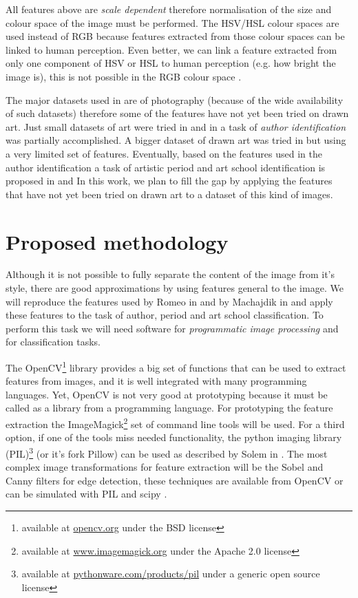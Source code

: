\documentclass[a4paper]{article}
\begin{document}
All features above are \emph{scale dependent} \cite{rmc12ajs,mach10clas}
therefore normalisation of the size and colour space of the image must be
performed.  The HSV/HSL colour spaces are used instead of RGB because features
extracted from those colour spaces can be linked to human perception.  Even
better, we can link a feature extracted from only one component of HSV or HSL
to human perception (e.g. how bright the image is), this is not possible in the
RGB colour space \cite{rmc12ajs}.

The major datasets used in \cite{rmc12ajs,mach10clas} are of photography
(because of the wide availability of such datasets) therefore some of the
features have not yet been tried on drawn art.  Just small datasets of art were
tried in \cite{mach10clas} and in \cite{rmc12ajs} a task of \emph{author
identification} was partially accomplished.  A bigger dataset of drawn art was
tried in \cite{zirnhelt07art} but using a very limited set of features.
Eventually, based on the features used in the author identification a task of
artistic period and art school identification is proposed in
\cite{zirnhelt07art} and \cite{rmc12ajs} In this work, we plan to fill the gap
by applying the features that have not yet been tried on drawn art to a dataset
of this kind of images.

\section{Proposed methodology}

Although it is not possible to fully separate the content of the image from
it's style, there are good approximations by using features general to the
image.  We will reproduce the features used by Romeo in \cite{rmc12ajs} and by
Machajdik in \cite{mach10clas} and apply these features to the task of author,
period and art school classification.  To perform this task we will need
software for \emph{programmatic image processing} and for classification tasks.

The OpenCV\footnote{available at \href{http://opencv.org/}{opencv.org} under
the BSD license} library provides a big set of functions that can be used to
extract features from images, and it is well integrated with many programming
languages.  Yet, OpenCV is not very good at prototyping because it must be
called as a library from a programming language.  For prototyping the feature
extraction the ImageMagick\footnote{available at
\href{http://www.imagemagick.org/}{www.imagemagick.org} under the Apache 2.0
license} set of command line tools will be used.  For a third option, if one of
the tools miss needed functionality, the python imaging library
(PIL)\footnote{available at
\href{http://pythonware.com/products/pil/}{pythonware.com/products/pil} under a
generic open source license} (or it's fork Pillow) can be used as described by
Solem in \cite{solem12book}.  The most complex image transformations for
feature extraction will be the Sobel and Canny filters for edge detection,
these techniques are available from OpenCV or can be simulated with PIL and
scipy \cite{oliphant06numpy}.
\end{document}
